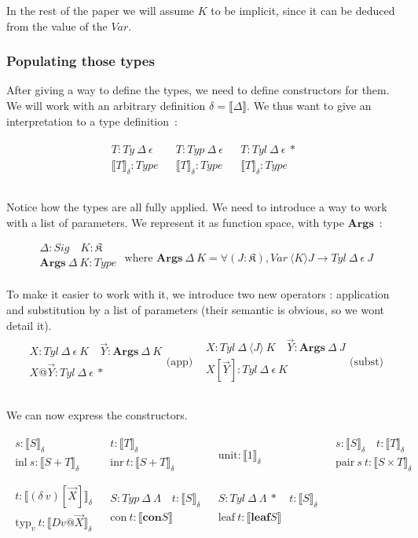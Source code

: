 \documentclass{article}
\newcommand{\vc}[1]{\overrightarrow{#1}}
\newcommand{\lbr}{\llbracket}
\newcommand{\rbr}{\rrbracket}
\newcommand{\sem}[1]{\lbr {#1} \rbr}
\newcommand{\msig}[1]{\langle {#1} \rangle}
\newcommand{\K}{\mathfrak{K}}
\newcommand{\con}{\mathbf{con}}
\newcommand{\args}{\mathbf{Args}}
\newcommand{\lf}{\mathbf{leaf}}
\newcommand{\irule}[2]{\begin{array}{c} {#1} \\\hline {#2}\\ \end{array}}
\begin{document}
In the rest of the paper we will assume $K$ to be implicit, since it can be
deduced from the value of the $Var$.

\subsubsection{Populating those types}

After giving a way to define the types, we need to define constructors for
them. We will work with an arbitrary definition $\delta = \sem{\Delta}$. We
thus want to give an interpretation to a type definition~:

\[\begin{array}{ccc}
    \irule{T : Ty\ \Delta\ \epsilon}{\sem{T}_\delta : Type}
    & \irule{T : Typ\ \Delta\ \epsilon}{\sem{T}_\delta : Type}
    & \irule{T : Tyl\ \Delta\ \epsilon\ *}{\sem{T}_\delta : Type}
    \\
\end{array}\]

Notice how the types are all fully applied. We need to introduce a way to work
with a list of parameters. We represent it as function space, with type
$\args$~:

\[\irule{\Delta : Sig\quad K : \K}{\args\ \Delta\ K : Type}
    \text{ where }
    \args\ \Delta\ K = \forall (J : \K), Var\ \msig{K} J\rightarrow Tyl\ \Delta\ \epsilon\ J
\]

To make it easier to work with it, we introduce two new operators : application
and substitution by a list of parameters (their semantic is obvious, so we wont
detail it).
\[\begin{array}{cc}
      \irule{X : Tyl\ \Delta\ \epsilon\ K\quad \vc{Y} : \args\ \Delta\ K}
        {X@\vc{Y} : Tyl\ \Delta\ \epsilon\ *}\text{(app)}
    & \irule{X : Tyl\ \Delta\ \msig{J}\ K\quad \vc{Y} : \args\ \Delta\ J}
        {X[\vc{Y}] : Tyl\ \Delta\ \epsilon\ K}\text{(subst)} \\
\end{array}\]

We can now express the constructors.

\[\begin{array}{cccc}
      \irule{s : \sem{S}_\delta}{\text{inl}\ s : \sem{S + T}_\delta}
    & \irule{t : \sem{T}_\delta}{\text{inr}\ t : \sem{S + T}_\delta}
    & \irule{}{\text{unit} : \sem{1}_\delta}
    & \irule{s : \sem{S}_\delta\quad t : \sem{T}_\delta}{\text{pair}\ s\ t : \sem{S\times T}_\delta}
    \\
      \irule{t : \sem{(\delta\ v)[\vc{X}]}_\delta}{\text{typ}_v\ t : \sem{D v@\vc{X}}_\delta}
    & \irule{S : Typ\ \Delta\ \Lambda\quad t : \sem{S}_\delta}{\text{con}\ t : \sem{\con S}}
    & \irule{S : Tyl\ \Delta\ \Lambda\ *\quad t : \sem{S}_\delta}{\text{leaf}\ t : \sem{\lf S}}
    &
    \\
\end{array}\]
\end{document}
